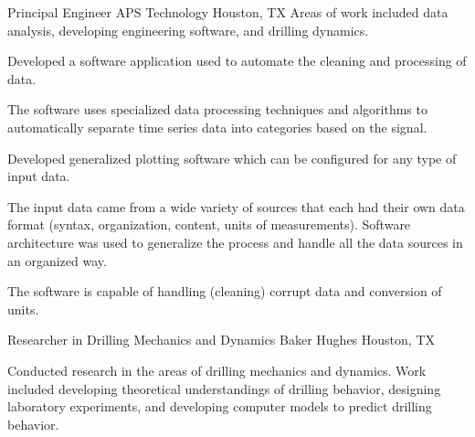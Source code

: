 \documentclass{leresume}
\begin{document}
            {Principal Engineer}
            {APS Technology}
			{Houston, TX}
			Areas of work included data analysis, developing engineering software, and drilling dynamics.\nolinebreak[4]
		\begin{bulletedlist}
			
		\item 
					Developed a software application used to automate the cleaning and processing of data.
				
		\begin{bulletedlist}
			
		\item 
						The software uses specialized data processing techniques and algorithms to automatically separate time series data into categories based on the signal.
					
		\end{bulletedlist}
	
		\item 
					Developed generalized plotting software which can be configured for any type of input data.
				
		\begin{bulletedlist}
			
		\item 
						The input data came from a wide variety of sources that each had their own data format (syntax, organization, content, units of measurements).  Software architecture
						was used to generalize the process and handle all the data sources in an organized way.
					
		\item 
						The software is capable of handling (cleaning) corrupt data and conversion of units.
					
		\end{bulletedlist}
	
		\end{bulletedlist}
	
            {Researcher in Drilling Mechanics and Dynamics}
            {Baker Hughes}
			{Houston, TX}
			
				Conducted research in the areas of drilling mechanics and dynamics.  Work included developing theoretical understandings of drilling behavior, designing laboratory experiments, and developing computer models to predict drilling behavior.
			
\end{document}

